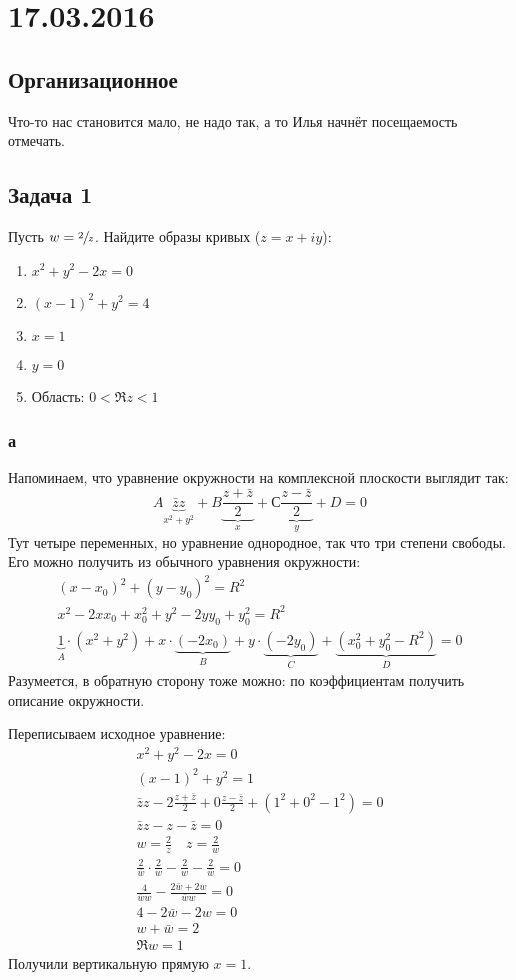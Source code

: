 \chapter{17.03.2016}

\section{Организационное}
	Что-то нас становится мало, не надо так, а то Илья начнёт посещаемость отмечать.

\section{Задача 1}
	Пусть $w = \sfrac{2}{z}$.
	Найдите образы кривых ($z=x+iy$):
	\begin{enumerate}[label=\asbuk{enumi}.]
		\item $x^2+y^2-2x=0$
		\item $(x-1)^2+y^2=4$
		\item $x=1$
		\item $y=0$
		\item Область: $0 < \Re z < 1$
	\end{enumerate}

	\subsection{а}
		\begin{Rem}
			Напоминаем, что уравнение окружности на комплексной плоскости выглядит так:
			\[
				A\underbrace{\bar z z}_{x^2+y^2} +
				B\underbrace{\frac{z+\bar z}{2}}_{x} +
				С\underbrace{\frac{z-\bar z}{2}}_{y} +
				D = 0
			\]
			Тут четыре переменных, но уравнение однородное, так что три степени свободы.
			Его можно получить из обычного уравнения окружности:
			\begin{gather*}
				(x-x_0)^2+(y-y_0)^2=R^2 \\
				x^2-2xx_0+x_0^2+y^2-2yy_0+y_0^2=R^2 \\
				\underbrace{1}_{A}\cdot(x^2+y^2)+x\cdot\underbrace{(-2x_0)}_{B}+y\cdot\underbrace{(-2y_0)}_{C}+\underbrace{(x_0^2+y_0^2-R^2)}_{D} = 0
			\end{gather*}
			Разумеется, в обратную сторону тоже можно: по коэффициентам получить описание окружности.
		\end{Rem}
		Переписываем исходное уравнение:
		\begin{gather*}
			x^2 + y^2 - 2x = 0 \\
			(x-1)^2 + y^2 = 1 \\
			\bar z z - 2\frac{z+\bar z}{2} + 0\frac{z-\bar z}{2} + (1^2+0^2-1^2) = 0 \\
			\bar z z - z - \bar z = 0 \\
			w = \frac{2}{z} \quad z = \frac{2}{w} \\
			\frac{2}{\bar w} \cdot \frac{2}{w} - \frac{2}{w} - \frac{2}{\bar w} = 0 \\
			\frac{4}{\bar w w} - \frac{2\bar w + 2w}{\bar w w} = 0 \\
			4 - 2\bar w - 2w = 0 \\
			w + \bar w = 2 \\
			\Re w = 1
		\end{gather*}
		Получили вертикальную прямую $x=1$.


